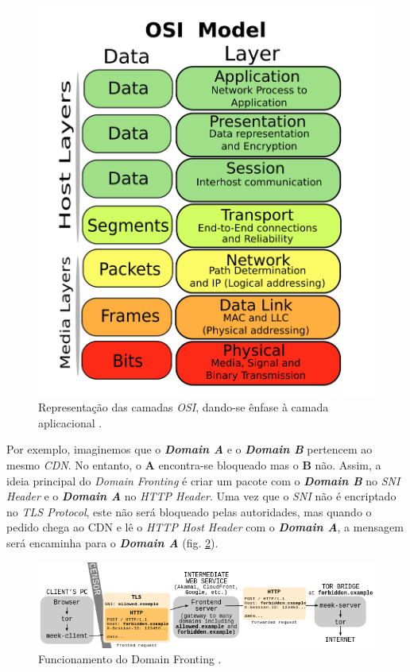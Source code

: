 \begin{figure}[H]
    \begin{center}
        \includegraphics[width=12cm]{img/OSI.png}
        \caption{Representação das camadas \textit{OSI}, dando-se ênfase à camada aplicacional \cite{OSI}.}
        \label{diagram:OSI}
    \end{center}
\end{figure}

Por exemplo, imaginemos que o \textbf{\textit{Domain A}} e o \textbf{\textit{Domain B}} pertencem ao mesmo \textit{CDN}. No entanto, o \textbf{A} encontra-se bloqueado mas o \textbf{B} não. Assim, a ideia principal do \textit{Domain Fronting} é criar um pacote com o \textbf{\textit{Domain B}} no \textit{SNI Header} e o \textbf{\textit{Domain A}} no \textit{HTTP Header}. Uma vez que o \textit{SNI} não é encriptado no \textit{TLS Protocol}, este não será bloqueado pelas autoridades, mas quando o pedido chega ao CDN e lê o \textit{HTTP Host Header} com o \textbf{\textit{Domain A}}, a mensagem será encaminha para o \textbf{\textit{Domain A}} (fig. \ref{diagram:domainFronting}).

\begin{figure}[H]
    \begin{center}
        \includegraphics[width=15cm]{img/domainFronting.png}
        \caption{Funcionamento do Domain Fronting \cite{df}.}
        \label{diagram:domainFronting}
    \end{center}
\end{figure}


